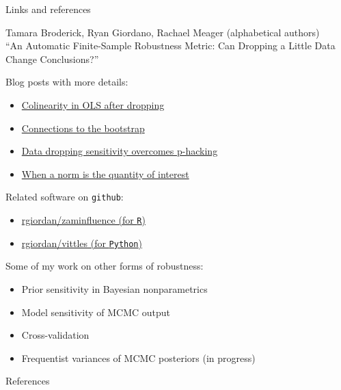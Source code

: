 \begin{frame}{Links and references}

\footnotesize

Tamara Broderick, Ryan Giordano, Rachael Meager
(alphabetical authors) \\
``An Automatic Finite-Sample Robustness Metric: Can Dropping a Little Data Change Conclusions?''

\hrulefill

Blog posts with more details:
\begin{itemize}
\item \href{https://rgiordan.github.io/amip/2021/12/17/reweighted_colinear_note.html}{Colinearity in OLS after dropping}
\item \href{https://rgiordan.github.io/amip/2021/11/08/bootstrap_influence.html}
{Connections to the bootstrap}
\item \href{https://rgiordan.github.io/robustness/2021/09/17/amip_p_hacking.html}
{Data dropping sensitivity overcomes p-hacking}
\item \href{https://rgiordan.github.io/differentiability/2021/07/20/norms.html}
{When a norm is the quantity of interest}
\end{itemize}


\hrulefill

Related software on \texttt{github}:
\begin{itemize}
\item \href{https://github.com/rgiordan/zaminfluence}
{rgiordan/zaminfluence (for \texttt{R})}
\item \href{https://github.com/rgiordan/vittles}
{rgiordan/vittles (for \texttt{Python})}
\end{itemize}

\hrulefill

Some of my work on other forms of robustness:
%
\begin{itemize}
    \item Prior sensitivity in Bayesian nonparametrics \citep{giordano2021bnp}
    \item Model sensitivity of MCMC output \citep{giordano2018covariances}
    \item Cross-validation \citep{giordano2019swiss}
    \item Frequentist variances of MCMC posteriors (in progress)
\end{itemize}

\end{frame}


\begin{frame}{References}


\begingroup
\renewcommand{\section}[2]{}%
{
\tiny

}
\endgroup

\end{frame}
